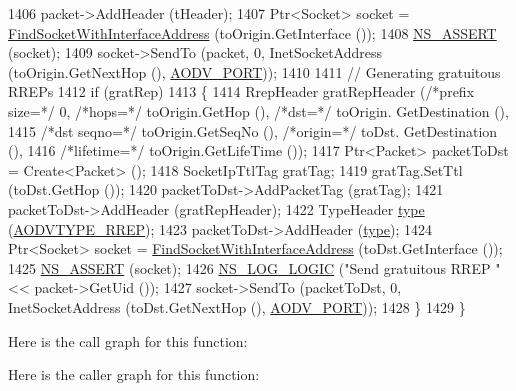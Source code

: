 \begin{DoxyCode}
1406   packet->AddHeader (tHeader);
1407   Ptr<Socket> socket = \hyperlink{classns3_1_1aodv_1_1RoutingProtocol_a7cebc7baa398569f432ea2521310dffe}{FindSocketWithInterfaceAddress} (toOrigin.GetInterface 
      ());
1408   \hyperlink{assert_8h_a6dccdb0de9b252f60088ce281c49d052}{NS\_ASSERT} (socket);
1409   socket->SendTo (packet, 0, InetSocketAddress (toOrigin.GetNextHop (), 
      \hyperlink{classns3_1_1aodv_1_1RoutingProtocol_ac4a3de99b49ad5f6efc9b71a700f7ec4}{AODV\_PORT}));
1410 
1411   \textcolor{comment}{// Generating gratuitous RREPs}
1412   \textcolor{keywordflow}{if} (gratRep)
1413     \{
1414       RrepHeader gratRepHeader (\textcolor{comment}{/*prefix size=*/} 0, \textcolor{comment}{/*hops=*/} toOrigin.GetHop (), \textcolor{comment}{/*dst=*/} toOrigin.
      GetDestination (),
1415                                                  \textcolor{comment}{/*dst seqno=*/} toOrigin.GetSeqNo (), \textcolor{comment}{/*origin=*/} toDst.
      GetDestination (),
1416                                                  \textcolor{comment}{/*lifetime=*/} toOrigin.GetLifeTime ());
1417       Ptr<Packet> packetToDst = Create<Packet> ();
1418       SocketIpTtlTag gratTag;
1419       gratTag.SetTtl (toDst.GetHop ());
1420       packetToDst->AddPacketTag (gratTag);
1421       packetToDst->AddHeader (gratRepHeader);
1422       TypeHeader \hyperlink{visualizer-ideas_8txt_add98db9e15e2a58cf2b57623e7aa893a}{type} (\hyperlink{namespacens3_1_1aodv_a8cf417608302ba0ed75225c976944d44a034af3d66c569436a630b5ee35399e45}{AODVTYPE\_RREP});
1423       packetToDst->AddHeader (\hyperlink{visualizer-ideas_8txt_add98db9e15e2a58cf2b57623e7aa893a}{type});
1424       Ptr<Socket> socket = \hyperlink{classns3_1_1aodv_1_1RoutingProtocol_a7cebc7baa398569f432ea2521310dffe}{FindSocketWithInterfaceAddress} (toDst.GetInterface
       ());
1425       \hyperlink{assert_8h_a6dccdb0de9b252f60088ce281c49d052}{NS\_ASSERT} (socket);
1426       \hyperlink{group__logging_ga88acd260151caf2db9c0fc84997f45ce}{NS\_LOG\_LOGIC} (\textcolor{stringliteral}{"Send gratuitous RREP "} << packet->GetUid ());
1427       socket->SendTo (packetToDst, 0, InetSocketAddress (toDst.GetNextHop (), 
      \hyperlink{classns3_1_1aodv_1_1RoutingProtocol_ac4a3de99b49ad5f6efc9b71a700f7ec4}{AODV\_PORT}));
1428     \}
1429 \}
\end{DoxyCode}


Here is the call graph for this function\+:




Here is the caller graph for this function\+:


